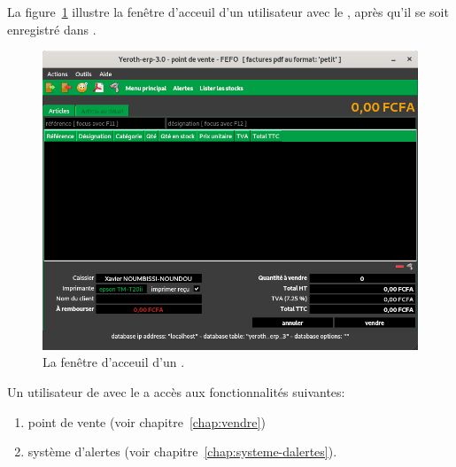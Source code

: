 \label{sec:utilisateurs-lecaissier}

La figure~\ref{fig:fenetre-principale-caissier} illustre la
fen\^etre d'acceuil d'un utilisateur avec le \role \caissier,
apr\`es qu'il se soit enregistr\'e dans \yeroth.\\

\begin{figure}[!htbp]
\centering
\includegraphics[scale=0.63]{images/yeren-fenetre-caissier.png}
\caption{La fen\^etre d'acceuil d'un \caissier.}
\label{fig:fenetre-principale-caissier}
\end{figure}

Un utilisateur de \yeroth avec le \role \caissier a acc\`es
aux fonctionnalit\'es suivantes:

\begin{enumerate}[1)]
	\item point de vente (voir chapitre~\ref{chap:vendre})
	\item syst\`eme d'alertes (voir chapitre~\ref{chap:systeme-dalertes}).\\
\end{enumerate}